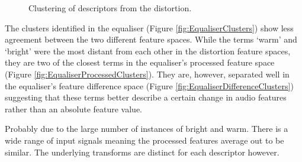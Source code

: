 		\begin{figure}[h!]
			\centering
			\qquad
			\caption{Clustering of descriptors from the distortion.}
			\label{fig:DistortionClusters}
		\end{figure}
		
		The clusters identified in the equaliser (Figure \ref{fig:EqualiserClusters}) show less agreement between
		the two different feature spaces. While the terms `warm' and `bright' were the most distant from each other
		in the distortion feature spaces, they are two of the closest terms in the equaliser's processed feature
		space (Figure \ref{fig:EqualiserProcessedClusters}). They are, however, separated well in the equaliser's
		feature difference space (Figure \ref{fig:EqualiserDifferenceClusters}) suggesting that these terms better
		describe a certain change in audio features rather than an absolute feature value.

		\note
		{
			Probably due to the large number of instances of bright and warm. There is a wide range of input
			signals meaning the processed features average out to be similar. The underlying transforms are
			distinct for each descriptor however.
		}
		
